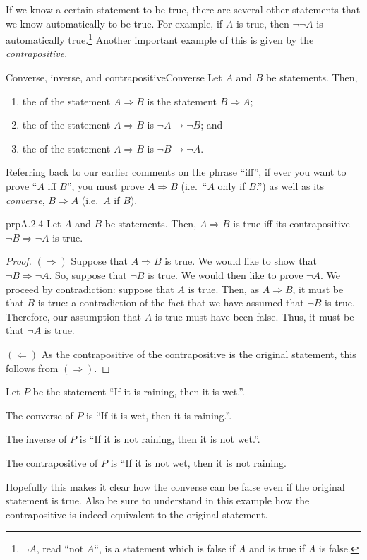 If we know a certain statement to be true, there are several other statements that we know automatically to be true.  For example, if $A$ is true, then $\neg \neg A$ is automatically true.\footnote{$\neg A$, read ``not $A$``, is a statement which is false if $A$ and is true if $A$ is false.}  Another important example of this is given by the \emph{contrapositive}.
\begin{dfn}{Converse, inverse, and contrapositive}{Converse}
Let $A$ and $B$ be statements.  Then,
\begin{enumerate}
\item the  of the statement $A\Rightarrow B$ is the statement $B\Rightarrow A$;
\item the  of the statement $A\Rightarrow B$ is $\neg A\rightarrow \neg B$; and
\item the  of the statement $A\Rightarrow B$ is $\neg B\rightarrow \neg A$.
\end{enumerate}
\begin{rmk}
Referring back to our earlier comments on the phrase ``iff'', if ever you want to prove ``$A$ iff $B$'', you must prove $A\Rightarrow B$ (i.e.~``$A$ only if $B$.'') as well as its \emph{converse}, $B\Rightarrow A$ (i.e.~$A$ if $B$).
\end{rmk}
\end{dfn}
\begin{prp}{}{prpA.2.4}
Let $A$ and $B$ be statements.  Then, $A\Rightarrow B$ is true iff its contrapositive $\neg B\Rightarrow \neg A$ is true.
\begin{proof}
$(\Rightarrow )$ Suppose that $A\Rightarrow B$ is true.  We would like to show that $\neg B\Rightarrow \neg A$.  So, suppose that $\neg B$ is true.  We would then like to prove $\neg A$.  We proceed by contradiction:  suppose that $A$ is true.  Then, as $A\Rightarrow B$, it must be that $B$ is true:  a contradiction of the fact that we have assumed that $\neg B$ is true.  Therefore, our assumption that $A$ is true must have been false.  Thus, it must be that $\neg A$ is true.

\blankline
\noindent
$(\Leftarrow )$ As the contrapositive of the contrapositive is the original statement, this follows from $(\Rightarrow )$.
\end{proof}
\end{prp}
\begin{exm}{}{}
Let $P$ be the statement ``If it is raining, then it is wet.''.

The converse of $P$ is ``If it is wet, then it is raining.''.

The inverse of $P$ is ``If it is not raining, then it is not wet.''.

The contrapositive of $P$ is ``If it is not wet, then it is not raining.

Hopefully this makes it clear how the converse can be false even if the original statement is true.  Also be sure to understand in this example how the contrapositive is indeed equivalent to the original statement.
\end{exm}

